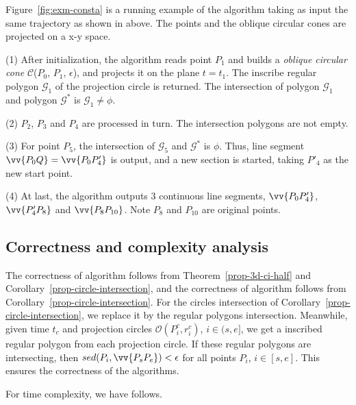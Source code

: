 \begin{example}
\label{exm-alg-conesta}
Figure~\ref{fig:exm-consta} is a running example of the \cista algorithm taking as input the same trajectory as shown in above.
The points and the oblique circular cones are projected on a x-y space.

\ni (1) After initialization, the \cista algorithm reads point $P_1$ and builds a \emph{oblique circular cone} $\mathcal{C}$($P_0$, $P_{1}$, $\epsilon$), and projects it on the plane $t=t_1$. The inscribe regular polygon $\mathcal{G}_1$ of the projection circle is returned. The intersection of polygon $\mathcal{G}_1$ and polygon $\mathcal{G}^*$ is $\mathcal{G}_1 \ne \phi$.

\ni (2) $P_2$, $P_3$ and $P_4$ are processed in turn. The intersection polygons are not empty.

\ni (3) For point $P_5$, the intersection of $\mathcal{G}_5$ and $\mathcal{G}^*$ is $\phi$. Thus, line segment $\vv{P_0Q} =\vv{P_0P'_4}$ is output, and a new section is started, taking $P'_4$ as the new start point.

\ni (4) At last, the algorithm outputs 3 continuous line segments, \ie $\vv{P_0P'_4}$, $\vv{P'_4P_8}$ and $\vv{P_8P_{10}}$. Note $P_8$ and $P_{10}$ are original points.
\end{example}






\subsection{Correctness and complexity analysis}

The correctness of algorithm \cist follows from Theorem~\ref{prop-3d-ci-half} and Corollary~\ref{prop-circle-intersection}, and the correctness of algorithm \cista follows from Corollary~\ref{prop-circle-intersection}. For the circles intersection of Corollary~\ref{prop-circle-intersection}, we replace it by the regular polygons intersection.
Meanwhile, given time $t_c$ and projection circles $\mathcal{O}(P^c_i, r^c_i)$, $i \in (s, e]$, we get a inscribed regular polygon from each projection circle.
If these regular polygons are intersecting, then $sed(P_i, \vv{P_sP_e})<\epsilon$ for all points $P_i$, $i \in [s,e]$.
This ensures the correctness of the algorithms.


For time complexity, we have follows.





